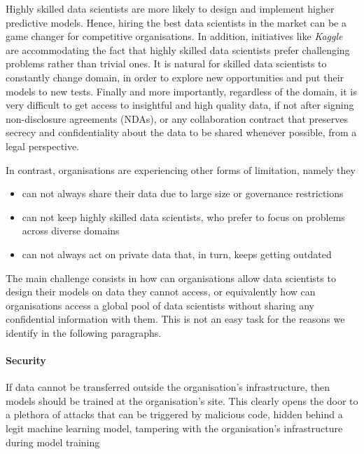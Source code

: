 \documentclass[12pt, a4paper,titlepage]{extreport}
\begin{document}
Highly skilled data scientists are more likely to design and implement higher predictive models. Hence, hiring the best data scientists in the market can be a game changer for competitive organisations. In addition, initiatives like \textit{Kaggle} \cite{kaggle} are accommodating the fact that highly skilled data scientists prefer challenging problems rather than trivial ones. It is natural for skilled data scientists to constantly change domain, in order to explore new opportunities and put their models to new tests. 
Finally and more importantly, regardless of the domain, it is very difficult to get access to insightful and high quality data, if not after signing non-disclosure agreements (NDAs), or any collaboration contract that preserves secrecy and confidentiality about the data to be shared whenever possible, from a legal perspective.

In contrast, organisations are experiencing other forms of limitation, namely they

\begin{itemize}
\item can not always share their data due to large size or governance restrictions
\item can not keep highly skilled data scientists, who prefer to focus on problems across diverse domains 
\item can not always act on private data that, in turn, keeps getting outdated 
\end{itemize}

The main challenge consists in how can organisations allow data scientists to design their models on data they cannot access, or equivalently how can organisations access a global pool of data scientists without sharing any confidential information with them. 
This is not an easy task for the reasons we identify in the following paragraphs. 


\paragraph{Security}
If data cannot be transferred outside the organisation's infrastructure, then models should be trained at the organisation's site. This clearly opens the door to a plethora of attacks that can be triggered by malicious code, hidden behind a legit machine learning model, tampering with the organisation's infrastructure during model training
\end{document}
